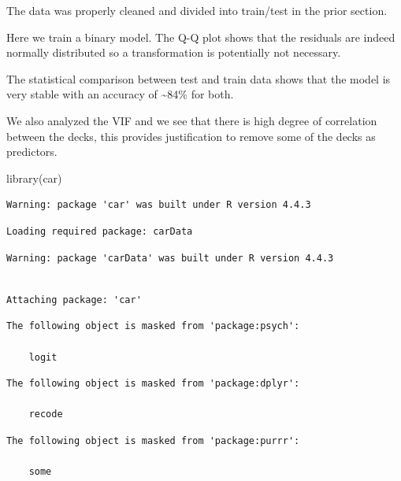 \documentclass[
  letterpaper,
  DIV=11,
  numbers=noendperiod]{scrartcl}
\newenvironment{Shaded}{\begin{snugshade}}{\end{snugshade}}
\newcommand{\FunctionTok}[1]{\textcolor[rgb]{0.28,0.35,0.67}{#1}}
\newcommand{\NormalTok}[1]{\textcolor[rgb]{0.00,0.23,0.31}{#1}}
\begin{document}
The data was properly cleaned and divided into train/test in the prior
section.

Here we train a binary model. The Q-Q plot shows that the residuals are
indeed normally distributed so a transformation is potentially not
necessary.

The statistical comparison between test and train data shows that the
model is very stable with an accuracy of \textasciitilde84\% for both.

We also analyzed the VIF and we see that there is high degree of
correlation between the decks, this provides justification to remove
some of the decks as predictors.

\begin{Shaded}
\begin{Highlighting}[]
\FunctionTok{library}\NormalTok{(car)}
\end{Highlighting}
\end{Shaded}

\begin{verbatim}
Warning: package 'car' was built under R version 4.4.3
\end{verbatim}

\begin{verbatim}
Loading required package: carData
\end{verbatim}

\begin{verbatim}
Warning: package 'carData' was built under R version 4.4.3
\end{verbatim}

\begin{verbatim}

Attaching package: 'car'
\end{verbatim}

\begin{verbatim}
The following object is masked from 'package:psych':

    logit
\end{verbatim}

\begin{verbatim}
The following object is masked from 'package:dplyr':

    recode
\end{verbatim}

\begin{verbatim}
The following object is masked from 'package:purrr':

    some
\end{verbatim}
\end{document}
